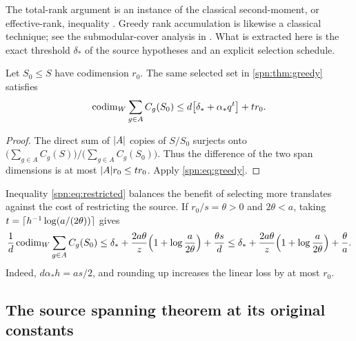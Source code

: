 The total-rank argument is an instance of the classical second-moment, or
effective-rank, inequality \cite{Welch1974Lower,Mixon2020Three}. Greedy rank
accumulation is likewise a classical technique; see the submodular-cover
analysis in \cite{Wolsey1982Analysis}. What is extracted here is the exact
threshold $\delta_*$ of the source hypotheses and an explicit selection
schedule.

\begin{lemma}\label{spn:lem:restriction}
Let $S_0\le S$ have codimension $r_0$. The same selected set in
\cref{spn:thm:greedy} satisfies
\begin{equation}\label{spn:eq:restricted}
 \operatorname{codim}_W\sum_{g\in A}C_g(S_0)\le d\bigl[\delta_*+\alpha_*q^t\bigr]+tr_0 .
\end{equation}
\end{lemma}

\begin{proof}
The direct sum of $\lvert A\rvert$ copies of $S/S_0$ surjects onto
$\bigl(\sum_{g\in A}C_g(S)\bigr)/\bigl(\sum_{g\in A}C_g(S_0)\bigr)$. Thus the
difference of the two span dimensions is at most $\lvert A\rvert r_0\le tr_0$. Apply
\eqref{spn:eq:greedy}.
\end{proof}

Inequality \eqref{spn:eq:restricted} balances the benefit of selecting more
translates against the cost of restricting the source. If $r_0/s=\theta>0$ and
$2\theta<a$, taking $t=\lceil h^{-1}\log(a/(2\theta))\rceil$ gives
\begin{equation}\label{spn:eq:optimized}
 \frac1d\operatorname{codim}_W\sum_{g\in A}C_g(S_0)
 \le\delta_*+\frac{2a\theta}{z}\Bigl(1+\log\frac{a}{2\theta}\Bigr)
 +\frac{\theta s}{d}
 \le\delta_*+\frac{2a\theta}{z}\Bigl(1+\log\frac{a}{2\theta}\Bigr)
 +\frac{\theta}{a}.
\end{equation}
Indeed, $d\alpha_*h=as/2$, and rounding up increases the linear loss by at most
$r_0$.

\subsection{The source spanning theorem at its original constants}\label{spn:sec:source-improvement}

